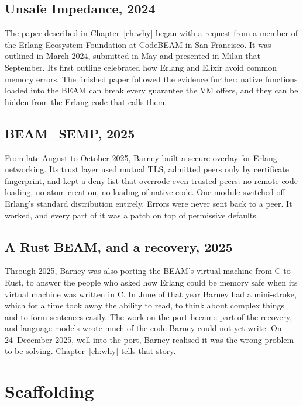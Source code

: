 \subsection{Unsafe Impedance, 2024}

The paper described in Chapter~\ref{ch:why} began with a request from a member
of the Erlang Ecosystem Foundation at CodeBEAM in San Francisco. It was outlined
in March 2024, submitted in May and presented in Milan that September. Its first
outline celebrated how Erlang and Elixir avoid common memory errors. The finished
paper followed the evidence further: native functions loaded into the BEAM can
break every guarantee the VM offers, and they can be hidden from the Erlang code
that calls them.


\subsection{BEAM\_SEMP, 2025}

From late August to October 2025, Barney built a secure overlay for Erlang
networking. Its trust layer used mutual TLS, admitted peers only by certificate
fingerprint, and kept a deny list that overrode even trusted peers: no remote
code loading, no atom creation, no loading of native code. One module switched
off Erlang's standard distribution entirely. Errors were never sent back to a
peer. It worked, and every part of it was a patch on top of permissive defaults.

\subsection{A Rust BEAM, and a recovery, 2025}

Through 2025, Barney was also porting the BEAM's virtual machine from C to Rust,
to answer the people who asked how Erlang could be memory safe when its virtual
machine was written in C. In June of that year Barney had a mini-stroke, which
for a time took away the ability to read, to think about complex things and to
form sentences easily. The work on the port became part of the recovery, and
language models wrote much of the code Barney could not yet write. On
24~December 2025, well into the port, Barney realised it was the wrong problem
to be solving. Chapter~\ref{ch:why} tells that story.

\section{Scaffolding}

